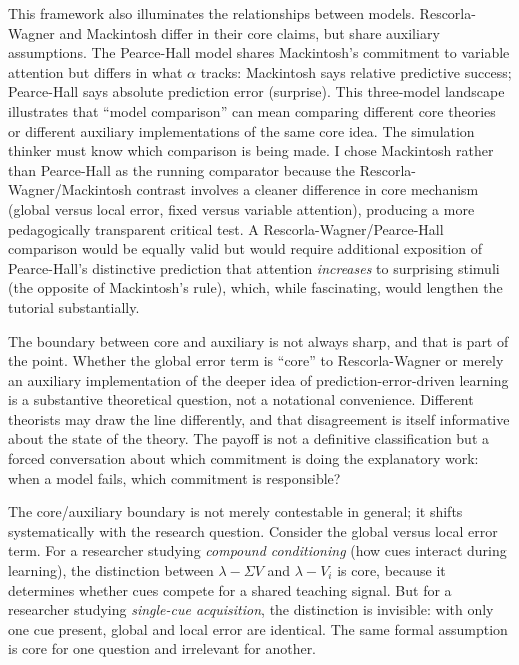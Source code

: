 \documentclass[fleqn,10pt]{wlscirep}
\begin{document}
\begin{linenumbers}
This framework also illuminates the relationships between models. Rescorla-Wagner and Mackintosh differ in their core claims, but share auxiliary assumptions. The Pearce-Hall model \citep{pearce1980model} shares Mackintosh's commitment to variable attention but differs in what $\alpha$ tracks: Mackintosh says relative predictive success; Pearce-Hall says absolute prediction error (surprise). This three-model landscape illustrates that ``model comparison'' can mean comparing different core theories or different auxiliary implementations of the same core idea. The simulation thinker must know which comparison is being made. I chose Mackintosh rather than Pearce-Hall as the running comparator because the Rescorla-Wagner/Mackintosh contrast involves a cleaner difference in core mechanism (global versus local error, fixed versus variable attention), producing a more pedagogically transparent critical test. A Rescorla-Wagner/Pearce-Hall comparison would be equally valid but would require additional exposition of Pearce-Hall's distinctive prediction that attention \emph{increases} to surprising stimuli (the opposite of Mackintosh's rule), which, while fascinating, would lengthen the tutorial substantially.

The boundary between core and auxiliary is not always sharp, and that is part of the point. Whether the global error term is ``core'' to Rescorla-Wagner or merely an auxiliary implementation of the deeper idea of prediction-error-driven learning is a substantive theoretical question, not a notational convenience. Different theorists may draw the line differently, and that disagreement is itself informative about the state of the theory. The payoff is not a definitive classification but a forced conversation about which commitment is doing the explanatory work: when a model fails, which commitment is responsible?

The core/auxiliary boundary is not merely contestable in general; it shifts systematically with the research question. Consider the global versus local error term. For a researcher studying \emph{compound conditioning} (how cues interact during learning), the distinction between $\lambda - \Sigma V$ and $\lambda - V_i$ is core, because it determines whether cues compete for a shared teaching signal. But for a researcher studying \emph{single-cue acquisition}, the distinction is invisible: with only one cue present, global and local error are identical. The same formal assumption is core for one question and irrelevant for another.


\end{linenumbers}
\end{document}
